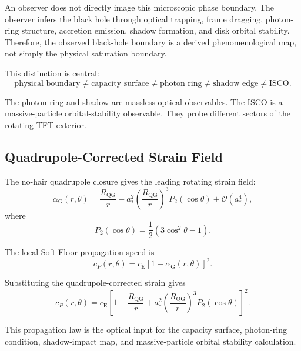 An observer does not directly image this microscopic phase boundary. The observer infers the black hole through optical trapping, frame dragging, photon-ring structure, accretion emission, shadow formation, and disk orbital stability. Therefore, the observed black-hole boundary is a derived phenomenological map, not simply the physical saturation boundary.

This distinction is central:
\begin{equation}
    \boxed{ \text{physical boundary} \neq \text{capacity surface} \neq \text{photon ring} \neq \text{shadow edge} \neq \text{ISCO}. }
\end{equation}

The photon ring and shadow are massless optical observables. The ISCO is a massive-particle orbital-stability observable. They probe different sectors of the rotating TFT exterior.

\subsection{Quadrupole-Corrected Strain Field}

The no-hair quadrupole closure gives the leading rotating strain field:
\begin{equation}
    \alpha_{\mathrm{G}}(r,\theta) = \frac{R_{\mathrm{QG}}}{r} - a_\ast^2 \left( \frac{R_{\mathrm{QG}}}{r} \right)^3 P_2(\cos\theta) + \mathcal{O}(a_\ast^4),
\end{equation}
where
\begin{equation}
    P_2(\cos\theta) = \frac{1}{2} \left( 3\cos^2\theta-1 \right).
\end{equation}

The local Soft-Floor propagation speed is
\begin{equation}
    c_P(r,\theta) = c_{\mathrm{E}} \left[ 1-\alpha_{\mathrm{G}}(r,\theta) \right]^2.
\end{equation}

Substituting the quadrupole-corrected strain gives
\begin{equation}
    \boxed{ c_P(r,\theta) = c_{\mathrm{E}} \left[ 1 - \frac{R_{\mathrm{QG}}}{r} + a_\ast^2 \left( \frac{R_{\mathrm{QG}}}{r} \right)^3 P_2(\cos\theta) \right]^2. }
\end{equation}

This propagation law is the optical input for the capacity surface, photon-ring condition, shadow-impact map, and massive-particle orbital stability calculation.

